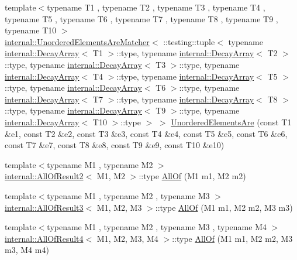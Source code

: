\begin{DoxyCompactItemize}
\item 
{\footnotesize template$<$typename T1 , typename T2 , typename T3 , typename T4 , typename T5 , typename T6 , typename T7 , typename T8 , typename T9 , typename T10 $>$ }\\\hyperlink{classtesting_1_1internal_1_1_unordered_elements_are_matcher}{internal\+::\+Unordered\+Elements\+Are\+Matcher}$<$ \+::testing\+::tuple$<$ typename \hyperlink{structtesting_1_1internal_1_1_decay_array}{internal\+::\+Decay\+Array}$<$ T1 $>$\+::type, typename \hyperlink{structtesting_1_1internal_1_1_decay_array}{internal\+::\+Decay\+Array}$<$ T2 $>$\+::type, typename \hyperlink{structtesting_1_1internal_1_1_decay_array}{internal\+::\+Decay\+Array}$<$ T3 $>$\+::type, typename \hyperlink{structtesting_1_1internal_1_1_decay_array}{internal\+::\+Decay\+Array}$<$ T4 $>$\+::type, typename \hyperlink{structtesting_1_1internal_1_1_decay_array}{internal\+::\+Decay\+Array}$<$ T5 $>$\+::type, typename \hyperlink{structtesting_1_1internal_1_1_decay_array}{internal\+::\+Decay\+Array}$<$ T6 $>$\+::type, typename \hyperlink{structtesting_1_1internal_1_1_decay_array}{internal\+::\+Decay\+Array}$<$ T7 $>$\+::type, typename \hyperlink{structtesting_1_1internal_1_1_decay_array}{internal\+::\+Decay\+Array}$<$ T8 $>$\+::type, typename \hyperlink{structtesting_1_1internal_1_1_decay_array}{internal\+::\+Decay\+Array}$<$ T9 $>$\+::type, typename \hyperlink{structtesting_1_1internal_1_1_decay_array}{internal\+::\+Decay\+Array}$<$ T10 $>$\+::type $>$ $>$ \hyperlink{namespacetesting_ae0e6c9754b17623a64358da8d38c4d13}{Unordered\+Elements\+Are} (const T1 \&e1, const T2 \&e2, const T3 \&e3, const T4 \&e4, const T5 \&e5, const T6 \&e6, const T7 \&e7, const T8 \&e8, const T9 \&e9, const T10 \&e10)
\item 
{\footnotesize template$<$typename M1 , typename M2 $>$ }\\\hyperlink{structtesting_1_1internal_1_1_all_of_result2}{internal\+::\+All\+Of\+Result2}$<$ M1, M2 $>$\+::type \hyperlink{namespacetesting_af7618e8606c1cb45738163688944e2b7}{All\+Of} (M1 m1, M2 m2)
\item 
{\footnotesize template$<$typename M1 , typename M2 , typename M3 $>$ }\\\hyperlink{structtesting_1_1internal_1_1_all_of_result3}{internal\+::\+All\+Of\+Result3}$<$ M1, M2, M3 $>$\+::type \hyperlink{namespacetesting_a75934d8ea6b986d2157a5ebfe68f9904}{All\+Of} (M1 m1, M2 m2, M3 m3)
\item 
{\footnotesize template$<$typename M1 , typename M2 , typename M3 , typename M4 $>$ }\\\hyperlink{structtesting_1_1internal_1_1_all_of_result4}{internal\+::\+All\+Of\+Result4}$<$ M1, M2, M3, M4 $>$\+::type \hyperlink{namespacetesting_a4a9a119cde16e43b364f3573136857a1}{All\+Of} (M1 m1, M2 m2, M3 m3, M4 m4)

\end{DoxyCompactItemize}
